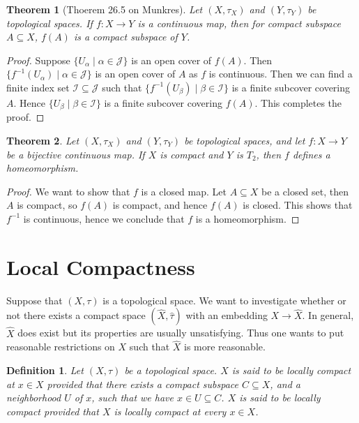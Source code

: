 \documentclass[11pt]{book}
\theoremstyle{break}
\theoremstyle{break}
\newtheorem{thm}{Theorem}[section]
\newtheorem{defn}{Definition}[corL]
\begin{document}
\begin{thm}[Thoerem 26.5 on Munkres]
Let $(X,\tau_X)$ and $(Y,\tau_Y)$ be topological spaces. If $f:X \to Y$ is a continuous map, then for compact subspace $A\subseteq X$, $f(A)$ is a compact subspace of $Y$. 
\end{thm}
\begin{proof}
Suppose $\{U_\alpha \mid \alpha \in \mathcal{J}\}$ is an open cover of $f(A)$. Then $\{f^{-1}(U_\alpha)\mid \alpha \in \mathcal{J}\}$ is an open cover of $A$ as $f$ is continuous. Then we can find a finite index set $\mathcal{I}\subseteq \mathcal{J}$ such that $\{f^{-1}(U_\beta) \mid \beta \in \mathcal{I}\}$ is a finite subcover covering $A$. Hence $\{U_\beta \mid \beta \in \mathcal{I}\}$ is a finite subcover covering $f(A)$. This completes the proof. 
\end{proof}


\begin{thm}
Let $(X,\tau_X)$ and $(Y,\tau_Y)$ be topological spaces, and let $f:X\to Y$ be a bijective continuous map. If $X$ is compact and $Y$ is $T_2$, then $f$ defines a homeomorphism. 
\end{thm}
\begin{proof}
We want to show that $f$ is a closed map. Let $A \subseteq X$ be a closed set, then $A$ is compact, so $f(A)$ is compact, and hence $f(A)$ is closed. This shows that $f^{-1}$ is continuous, hence we conclude that $f$ is a homeomorphism.
\end{proof}

\newpage
\section[Local Compactness]{\color{red}Local Compactness\color{black}}
Suppose that $(X,\tau)$ is a topological space. We want to investigate whether or not there exists a compact space $(\hat{X},\hat{\tau})$ with an embedding $X \to \hat{X}$. In general, $\hat{X}$ does exist but its properties are usually unsatisfying. Thus one wants to put reasonable restrictions on $X$ such that $\hat{X}$ is more reasonable.\\

\begin{defn}
Let $(X,\tau)$ be a topological space. $X$ is said to be locally compact at $x \in X$ provided that there exists a compact subspace $C\subseteq X$, and a neighborhood $U$ of $x$, such that we have $x \in U \subseteq C$. $X$ is said to be locally compact provided that $X$ is locally compact at every $x \in X$. 
\end{defn}
\end{document}
